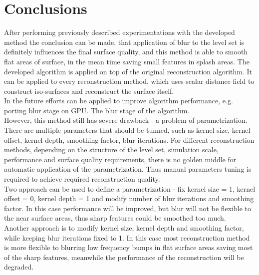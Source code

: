 \section{Conclusions}
After performing previously described experimentations with the developed method the conclusion can be made, that application of blur to the level set is definitely influences the final surface quality, and this method is able to smooth flat areas of surface, in the mean time saving small features in splash areas. The developed algorithm is applied on top of the original reconstruction algorithm. It can be applied to every reconstruction method, which uses scalar distance field to construct iso-surfaces and reconstruct the surface itself.\\ 
In the future efforts can be applied to improve algorithm performance, e.g. porting blur stage on GPU. The blur stage of the algorithm.\\
However, this method still has severe drawback - a problem of parametrization. There are multiple parameters that should be tunned, such as kernel size, kernel offset, kernel depth, smoothing factor, blur iterations. For different reconstruction methods, depending on the structure of the level set, simulation scale, performance and surface quality requirements, there is no golden middle for automatic application of the parametrization. Thus manual parameters tuning is required to achieve required reconstruction quality.\\
Two approach can be used to define a parametrization - fix kernel size = 1, kernel offset = 0, kernel depth = 1 and modify number of blur iterations and smoothing factor. In this case performance will be improved, but blur will not be flexible to the near surface areas, thus sharp features could be smoothed too much.\\
Another approach is to modify kernel size, kernel depth and smoothing factor, while keeping blur iterations fixed to 1. In this case most reconstruction method is more flexible to blurring low frequency bumps in flat surface areas saving most of the sharp features, meanwhile the performance of the reconstruction will be degraded.

